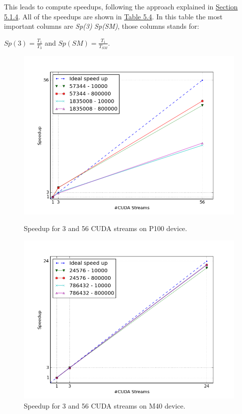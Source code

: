 			
	This leads to compute speedups, following the approach explained in \hyperref[subs:resgath]{Section 5.1.4}. All of the speedups are shown in \hyperref[tab:cosspeedup]{Table 5.4}. In this table the most important columns are \textit{Sp(3)} \textit{Sp(SM)}, those columns stands for:
	\begin{center}
		\(Sp(3) =  \frac{T_{1}}{T_{3}} \)  and   
		\(Sp(SM) = \frac{T_{1}}{T_{SM}} \).\\
	\end{center}
	
	
	\begin{figure}
		\vspace{-2cm}
		\includegraphics[scale=0.7]{plots/figure_25.png}
		\caption{Speedup for 3 and 56 CUDA streams on P100 device.}
		\label{fig:p100sp}
		\includegraphics[scale=0.7]{plots/figure_26.png}
		\caption{Speedup for 3 and 56 CUDA streams on M40 device.}
		\label{fig:m40sp}
	\end{figure}

